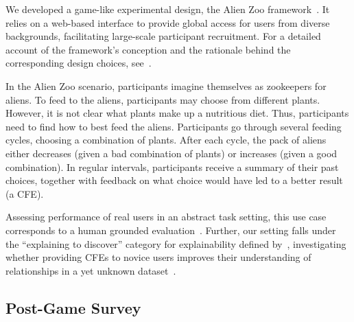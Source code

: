We developed a game-like experimental design, the Alien Zoo framework~\citep{IAZ ARXIV}.
It relies on a web-based interface to provide global access for users from diverse backgrounds, facilitating large-scale participant recruitment.
For a detailed account of the framework's conception and the rationale behind the corresponding design choices, see~\citet{IAZ ARXIV}.

In the Alien Zoo scenario, participants imagine themselves as zookeepers for aliens. 
To feed to the aliens, participants may choose from different plants. 
However, it is not clear what plants make up a nutritious diet. 
Thus, participants need to find how to best feed the aliens. 
Participants go through several feeding cycles, choosing a combination of plants. 
After each cycle, the pack of aliens either decreases (given a bad combination of plants) or increases (given a good combination). 
In regular intervals, participants receive a summary of their past choices, together with feedback on what choice would have led to a better result (\ie a \gls{CFE}).


Assessing performance of real users in an abstract task setting, this use case corresponds to a human grounded evaluation~\citep{doshi-velez_towards_2017}.
Further, our setting falls under the ``explaining to discover'' category for explainability defined by~\citeauthor{adadi_peeking_2018}, investigating whether providing \glspl{CFE} to novice users improves their understanding of relationships in a yet unknown dataset~\citep{adadi_peeking_2018}.


\subsection{Post-Game Survey}

